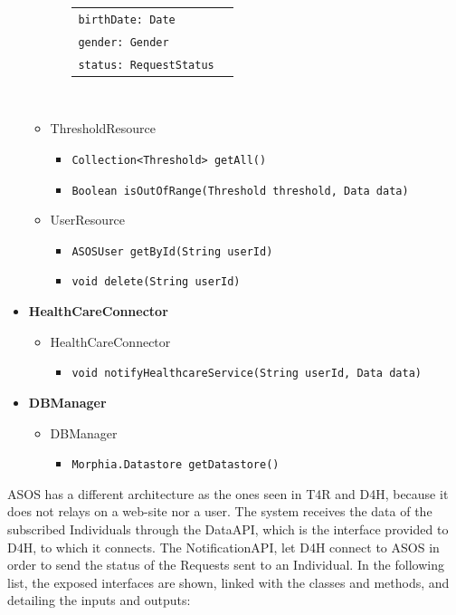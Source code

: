 \documentclass[a4paper, hidelinks, 12pt]{report}
\begin{document}
\begin{itemize}
\begin{itemize}
\begin{itemize}
\begin{tabular}{l | l}
					\verb|birthDate: Date| & \\
					\verb|gender: Gender| & \\
					\verb|status: RequestStatus| & \\
				\end{tabular}\\
					\end{itemize}
					\item{ThresholdResource}
					\begin{itemize}
						\item{\verb|Collection<Threshold> getAll()|}
						\item{\verb|Boolean isOutOfRange(Threshold threshold, Data data)|}
					\end{itemize}
					\item{UserResource}
					\begin{itemize}
						\item{\verb|ASOSUser getById(String userId)|}
						\item{\verb|void delete(String userId)|}
					\end{itemize}
			\end{itemize}
		\item{\textbf{HealthCareConnector}}
			\begin{itemize}
				\item{HealthCareConnector}
					\begin{itemize}
						\item{\verb|void notifyHealthcareService(String userId, Data data)|}
					\end{itemize}
			\end{itemize}
		\item{\textbf{DBManager}}
			\begin{itemize}
				\item{DBManager}
					\begin{itemize}
						\item{\verb|Morphia.Datastore getDatastore()|}
					\end{itemize}
			\end{itemize}
	\end{itemize}
	
	ASOS has a different architecture as the ones seen in T4R and D4H, because it does not relays on a web-site nor a user. The system receives the data of the subscribed Individuals through the DataAPI, which is the interface provided to D4H, to which it connects. The NotificationAPI, let D4H connect to ASOS in order to send the status of the Requests sent to an Individual.  In the following list, the exposed interfaces are shown, linked with the classes and methods, and detailing the inputs and outputs:
	
\end{document}
